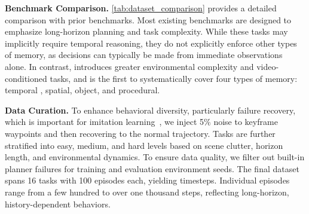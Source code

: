 {\relax
\noindent\textbf{Benchmark Comparison.}
\cref{tab:dataset_comparison} provides a detailed comparison with prior benchmarks. Most existing benchmarks \cite{han2025robocerebra, zhang2025vlabench, mees2022calvin} are designed to emphasize long-horizon planning and task complexity. While these tasks may implicitly require temporal reasoning, they do not explicitly enforce other types of memory, as decisions can typically be made from immediate observations alone.
In contrast, \benchname\xspace introduces greater environmental complexity and video-conditioned tasks, and is the first to systematically cover four types of memory: temporal%
, spatial, object, and procedural. 
\par}



\noindent\textbf{Data Curation.}
To enhance behavioral diversity, particularly failure recovery, which is important for imitation learning~\cite{dai2025racer}, we inject 5\% noise to keyframe waypoints and then recovering to the normal trajectory. 
Tasks are further stratified into easy, medium, and hard levels based on scene clutter, horizon length, and environmental dynamics. 
To ensure data quality, we filter out built-in planner failures for training and evaluation environment seeds. 
The final dataset spans 16 tasks with 100 episodes each, yielding \trainsteps\xspace timesteps. 
Individual episodes range from a few hundred to over one thousand steps, reflecting long-horizon, history-dependent behaviors.

